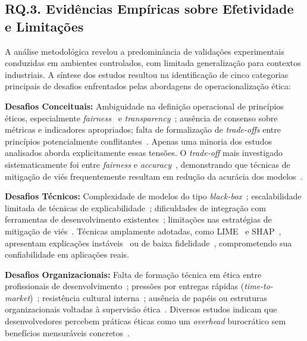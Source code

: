 \subsection{RQ.3. Evidências Empíricas sobre Efetividade e Limitações}

A análise metodológica revelou a predominância de validações experimentais conduzidas em ambientes controlados, com limitada generalização para contextos industriais. A síntese dos estudos resultou na identificação de cinco categorias principais de desafios enfrentados pelas abordagens de operacionalização ética:

\textbf{Desafios Conceituais:} Ambiguidade na definição operacional de princípios éticos, especialmente \textit{fairness}~\cite{Verma2018, Binns2020} e \textit{transparency}~\cite{Ananny2018, Felzmann2019}; ausência de consenso sobre métricas e indicadores apropriados; falta de formalização de \textit{trade-offs} entre princípios potencialmente conflitantes~\cite{Selbst2019, Green2019}. Apenas uma minoria dos estudos analisados aborda explicitamente essas tensões. O \textit{trade-off} mais investigado sistematicamente foi entre \textit{fairness} e \textit{accuracy}~\cite{Chouldechova2017, Kleinberg2017}, demonstrando que técnicas de mitigação de viés frequentemente resultam em redução da acurácia dos modelos~\cite{Menon2018, CorbettDavies2018}.

\textbf{Desafios Técnicos:} Complexidade de modelos do tipo \textit{black-box}~\cite{Rudin2019, Lipton2018}; escalabilidade limitada de técnicas de explicabilidade~\cite{Lage2019, Bhatt2020}; dificuldades de integração com ferramentas de desenvolvimento existentes~\cite{Amershi2019, Hohman2020}; limitações nas estratégias de mitigação de viés~\cite{Friedler2021, Kallus2018}. Técnicas amplamente adotadas, como LIME~\cite{Ribeiro2016} e SHAP~\cite{Lundberg2017}, apresentam explicações instáveis~\cite{Alvarez-Melis2018} ou de baixa fidelidade~\cite{Ghorbani2019}, comprometendo sua confiabilidade em aplicações reais.

\textbf{Desafios Organizacionais:} Falta de formação técnica em ética entre profissionais de desenvolvimento~\cite{McNamara2018, Fiesler2020}; pressões por entregas rápidas (\textit{time-to-market})~\cite{Rakova2021, Holstein2019}; resistência cultural interna~\cite{Madaio2020, Moss2021}; ausência de papéis ou estruturas organizacionais voltadas à supervisão ética~\cite{Metcalf2021}. Diversos estudos indicam que desenvolvedores percebem práticas éticas como um \textit{overhead} burocrático sem benefícios mensuráveis concretos~\cite{Vakkuri2020, Shneiderman2020}.

